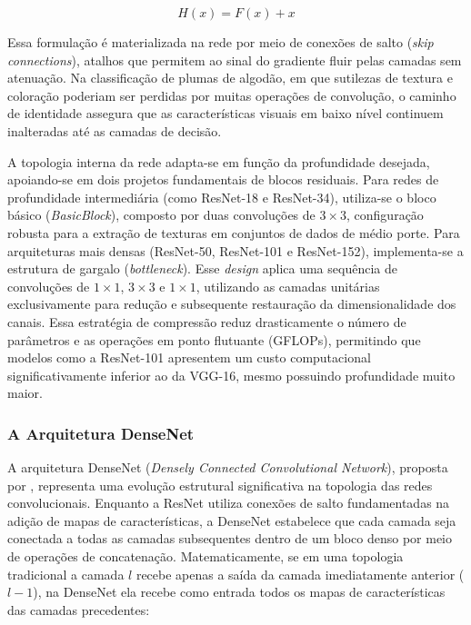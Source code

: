        $$H(x)=F(x)+x$$
        
        Essa formulação é materializada na rede por meio de conexões de salto (\textit{skip connections}), atalhos que permitem ao sinal do gradiente fluir pelas camadas sem atenuação. Na classificação de plumas de algodão, em que sutilezas de textura e coloração poderiam ser perdidas por muitas operações de convolução, o caminho de identidade assegura que as características visuais em baixo nível continuem inalteradas até as camadas de decisão.

        A topologia interna da rede adapta-se em função da profundidade desejada, apoiando-se em dois projetos fundamentais de blocos residuais. Para redes de profundidade intermediária (como ResNet-18 e ResNet-34), utiliza-se o bloco básico (\textit{BasicBlock}), composto por duas convoluções de $3 \times 3$, configuração robusta para a extração de texturas em conjuntos de dados de médio porte. Para arquiteturas mais densas (ResNet-50, ResNet-101 e ResNet-152), implementa-se a estrutura de gargalo (\textit{bottleneck}). Esse \textit{design} aplica uma sequência de convoluções de $1 \times 1$, $3 \times 3$ e $1 \times 1$, utilizando as camadas unitárias exclusivamente para redução e subsequente restauração da dimensionalidade dos canais. Essa estratégia de compressão reduz drasticamente o número de parâmetros e as operações em ponto flutuante (GFLOPs), permitindo que modelos como a ResNet-101 apresentem um custo computacional significativamente inferior ao da VGG-16, mesmo possuindo profundidade muito maior.



    \subsubsection{A Arquitetura DenseNet}

        A arquitetura DenseNet (\textit{Densely Connected Convolutional Network}), proposta por , representa uma evolução estrutural significativa na topologia das redes convolucionais. Enquanto a ResNet utiliza conexões de salto fundamentadas na adição de mapas de características, a DenseNet estabelece que cada camada seja conectada a todas as camadas subsequentes dentro de um bloco denso por meio de operações de concatenação. Matematicamente, se em uma topologia tradicional a camada $l$ recebe apenas a saída da camada imediatamente anterior ($l-1$), na DenseNet ela recebe como entrada todos os mapas de características das camadas precedentes:
        
